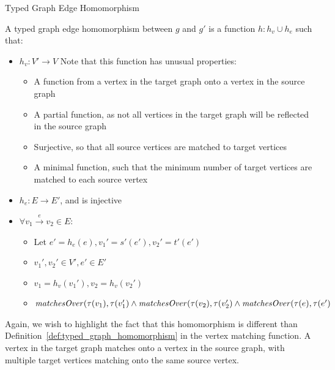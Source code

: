 \begin{definition}{Typed Graph Edge Homomorphism\\}
\label{def:typed_graph_edge_homomorphism}

A typed graph edge homomorphism between $g$ and $g'$ is a function $h: h_v \cup h_e$ such that:
\begin{itemize}
\item $h_v: V'\rightarrow V$ Note that this function has unusual properties:
\begin{itemize}

\item A function from a vertex in the target graph onto a vertex in the source graph
\item A partial function, as not all vertices in the target graph will be reflected in the source graph
\item Surjective, so that all source vertices are matched to target vertices
\item A minimal function, such that the minimum number of target  vertices are matched to each source vertex 
\end{itemize}
\item $h_e: E\rightarrow E'$, and is injective
\item $\forall v_1 \xrightarrow{e} v_2\in E$:
\begin{itemize}
\item Let $e' = h_e(e), v_1' = s'(e'), v_2' = t'(e')$
\item $v_1', v_2' \in V', e' \in E'$
\item $v_1 = h_v(v_1'), v_2 = h_v(v_2')$
\item $\mathit{matchesOver}(\tau(v_1), \tau(v_1') \land \\\mathit{matchesOver}(\tau(v_2), \tau(v_2') \land\\ \mathit{matchesOver}(\tau(e), \tau(e')$
\end{itemize}
 
\end{itemize}  
\end{definition}

Again, we wish to highlight the fact that this homomorphism is different than Definition~\ref{def:typed_graph_homomorphism} in the vertex matching function. A vertex in the target graph matches onto a vertex in the source graph, with multiple target vertices matching onto the same source vertex. 

